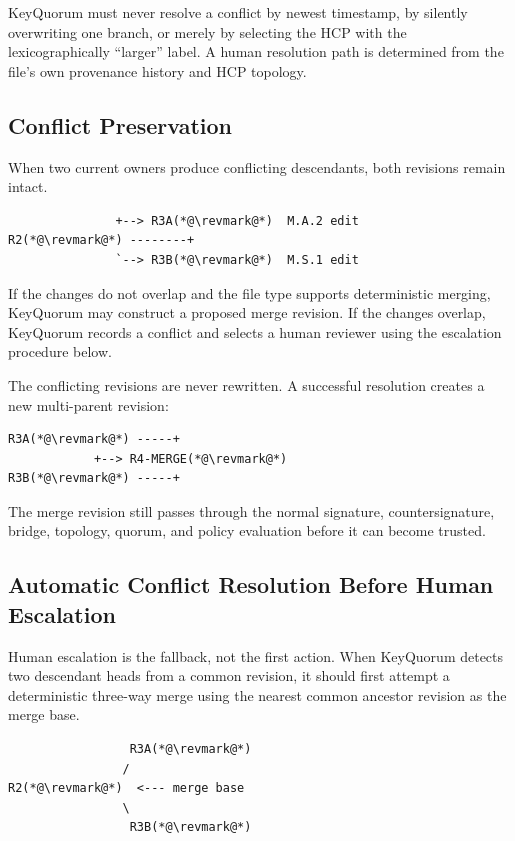 \documentclass[11pt]{article}
\begin{document}
KeyQuorum must never resolve a conflict by newest timestamp, by silently overwriting one branch, or merely by selecting the HCP with the lexicographically ``larger'' label. A human resolution path is determined from the file's own provenance history and HCP topology.

\subsection{Conflict Preservation}

When two current owners produce conflicting descendants, both revisions remain intact.

\begin{lstlisting}
               +--> R3A(*@\revmark@*)  M.A.2 edit
R2(*@\revmark@*) --------+
               `--> R3B(*@\revmark@*)  M.S.1 edit
\end{lstlisting}

If the changes do not overlap and the file type supports deterministic merging, KeyQuorum may construct a proposed merge revision. If the changes overlap, KeyQuorum records a conflict and selects a human reviewer using the escalation procedure below.

The conflicting revisions are never rewritten. A successful resolution creates a new multi-parent revision:

\begin{lstlisting}
R3A(*@\revmark@*) -----+
            +--> R4-MERGE(*@\revmark@*)
R3B(*@\revmark@*) -----+
\end{lstlisting}

The merge revision still passes through the normal signature, countersignature, bridge, topology, quorum, and policy evaluation before it can become trusted.


\subsection{Automatic Conflict Resolution Before Human Escalation}

Human escalation is the fallback, not the first action. When KeyQuorum detects two descendant heads from a common revision, it should first attempt a deterministic three-way merge using the nearest common ancestor revision as the merge base.

\begin{lstlisting}
                 R3A(*@\revmark@*)
                /
R2(*@\revmark@*)  <--- merge base
                \
                 R3B(*@\revmark@*)
\end{lstlisting}
\end{document}
